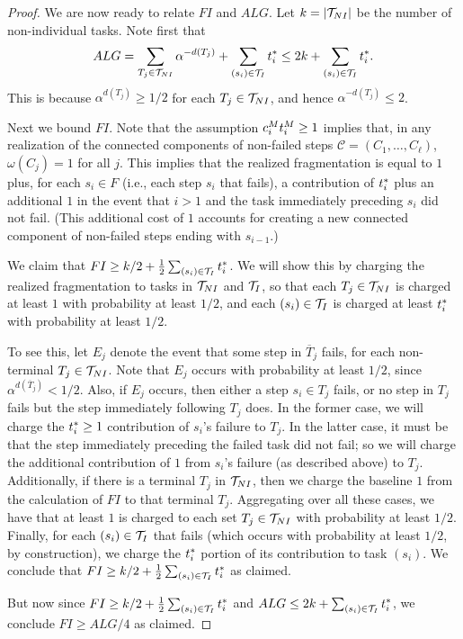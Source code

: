 \begin{proof}
    \medskip

    We are now ready to relate $FI$ and $ALG$.
    Let $k = |\mathcal{T}_{NI}|$ be the number of non-individual tasks.
    Note first that
    \[ ALG = \sum_{T_j \in \mathcal{T}_{NI}} \alpha^{-d(T_j)} + \sum_{(s_i) \in \mathcal{T}_I} t^*_{i} \leq 2k + \sum_{(s_i) \in \mathcal{T}_I} t^*_{i}. \]
    This is because $\alpha^{d(T_j)} \geq 1/2$ for each $T_j \in \mathcal{T}_{NI}$, and hence $\alpha^{-d(T_j)} \leq 2$.

    \medskip

    Next we bound $FI$.
    Note that the assumption $c^{M}_{i}t^{M}_{i} \geq 1$ implies that, in any realization of the connected components of non-failed steps $\mathcal{C} = (C_1, \dotsc, C_\ell)$, $\omega(C_j) = 1$ for all $j$.
    This implies that the realized fragmentation is equal to $1$ plus, for each $s_i \in F$ (i.e., each step $s_i$ that fails), a contribution of $t^*_{i}$ plus an additional $1$ in the event that $i > 1$ and the task immediately preceding $s_i$ did not fail.
    (This additional cost of $1$ accounts for creating a new connected component of non-failed steps ending with $s_{i-1}$.)

    We claim that $FI \geq k/2 + \frac{1}{2}\sum_{(s_i) \in \mathcal{T}_I} t^*_{i}$.
    We will show this by charging  the realized fragmentation to tasks in $\mathcal{T}_{NI}$ and $\mathcal{T}_I$, so that each $T_j \in \mathcal{T}_{NI}$ is charged at least $1$ with probability at least $1/2$, and each $(s_i) \in \mathcal{T}_I$ is charged at least $t^*_{i}$ with probability at least $1/2$.

    To see this, let $E_j$ denote the event that some step in $\overline{T}_j$ fails, for each non-terminal $T_j \in \mathcal{T}_{NI}$.
    Note that $E_j$ occurs with probability at least $1/2$, since $\alpha^{d(\overline{T}_j)} < 1/2$.
    Also, if $E_j$ occurs, then either a step $s_i \in T_j$ fails, or no step in $T_j$ fails but the step immediately following $T_j$ does.
    In the former case, we will charge the $t^*_{i} \geq 1$ contribution of $s_i$'s failure to $T_j$.
    In the latter case, it must be that the step immediately preceding the failed task did not fail; so we will charge the additional contribution of $1$ from $s_i$'s failure (as described above) to $T_j$.
    Additionally, if there is a terminal $T_j$ in $\mathcal{T}_{NI}$, then we charge the baseline $1$ from the calculation of $FI$ to that terminal $T_j$.
    Aggregating over all these cases, we have that at least $1$ is charged to each set $T_j \in \mathcal{T}_{NI}$ with probability at least $1/2$.
    Finally, for each $(s_i) \in \mathcal{T}_I$ that fails (which occurs with probability at least $1/2$, by construction), we charge the $t^*_{i}$ portion of its contribution to task $(s_i)$.
    We conclude that $FI \geq k/2 + \frac{1}{2}\sum_{(s_i) \in \mathcal{T}_I}t^*_{i}$ as claimed.

    But now since $FI \geq k/2 + \frac{1}{2}\sum_{(s_i) \in \mathcal{T}_I}t^*_{i}$ and $ALG \leq 2k + \sum_{(s_i) \in \mathcal{T}_I}t^*_{i}$, we conclude $FI \geq ALG/4$ as claimed.
\end{proof}

